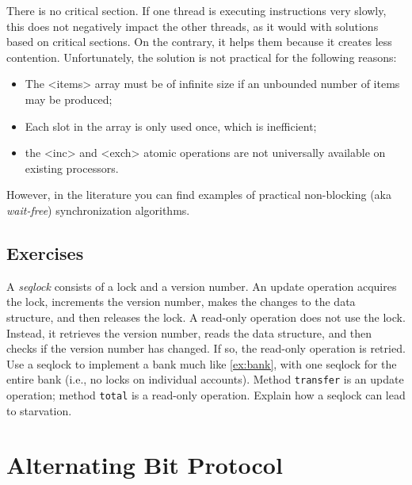 \documentclass{report}
\begin{document}
There is no critical section.  If one thread is executing instructions
very slowly, this does not negatively impact the other threads, as it
would with solutions based on critical sections.
On the contrary, it helps them because it creates less contention.
Unfortunately, the solution is not practical for the following reasons:
\begin{itemize}
\item The <{items}> array must be of infinite size if an unbounded number
of items may be produced;
\item Each slot in the array is only used once, which is inefficient;
\item the <{inc}> and <{exch}> atomic operations are not
universally available on existing processors.
\end{itemize}
However, in the literature you can find examples of practical
non-blocking (aka \emph{wait-free})
%
synchronization algorithms.

\section*{Exercises}
\begin{problems}
\item A \emph{seqlock}
%
consists of a lock and a version number.
An update operation acquires the lock, increments the version number, makes the
changes to the data structure, and then releases the lock.  A read-only operation
does not use the lock.  Instead, it retrieves the version number,
reads the data structure, and then checks if the
version number has changed.  If so, the read-only operation is retried.
Use a seqlock to implement a bank much like \autoref{ex:bank}, with
one seqlock for the entire bank (i.e., no locks on individual accounts).
Method \texttt{transfer} is an update operation; method \texttt{total} is a
read-only operation.  Explain how a seqlock can lead to starvation.
\end{problems}

\chapter{Alternating Bit Protocol}
\label{ch:abp}
%
%
%
\end{document}
